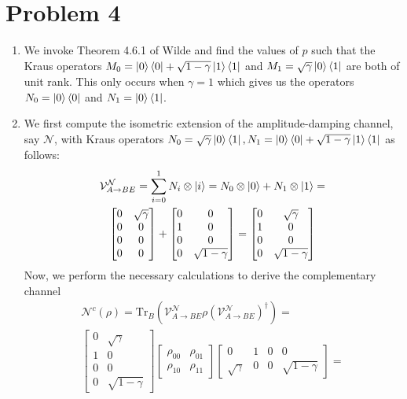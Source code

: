 \documentclass[12pt]{article}%
\begin{document}
\section*{Problem 4}
\begin{enumerate}
  \item We invoke Theorem 4.6.1 of Wilde and find the values of $p$ such that the Kraus operators $M_0 = \ket{0}\bra{0} + \sqrt{1 - \gamma}\ket{1}\bra{1}$ and $M_1 = \sqrt{\gamma}\ket{0}\bra{1}$ are both of unit rank. This only occurs when $\gamma = 1$ which gives us the operators $N_0 = \ket{0}\bra{0}$ and $N_1 = \ket{0}\bra{1}$.
  \item We first compute the isometric extension of the amplitude-damping channel, say $\mathcal{N}$, with Kraus operators $N_0 = \sqrt{\gamma}\ket{0}\bra{1},N_1 = \ket{0}\bra{0} + \sqrt{1 - \gamma}\ket{1}\bra{1}$ as follows:
  \begin{gather*}
    \mathcal{V}_{A \rightarrow BE}^{\mathcal{N}} = \sum_{i=0}^1 N_i \otimes \ket{i} = N_0 \otimes \ket{0} + N_1 \otimes \ket{1} = \\
    \left[\begin{matrix} 0 & \sqrt{\gamma} \\  0 & 0  \\ 0 & 0 \\ 0 & 0 \end{matrix}\right] + \left[\begin{matrix} 0 & 0 \\  1 & 0  \\ 0 & 0 \\ 0 & \sqrt{1-\gamma} \end{matrix}\right] = \left[\begin{matrix} 0 & \sqrt{\gamma} \\  1 & 0 \\ 0 &0 \\ 0 & \sqrt{1 - \gamma} \end{matrix}\right]
  \end{gather*}
  Now, we perform the necessary calculations to derive the complementary channel
  \begin{gather*}
    \mathcal{N}^c(\rho) = \text{Tr}_B(\mathcal{V}_{A \rightarrow BE}^{\mathcal{N}}\rho  (\mathcal{V}_{A \rightarrow BE}^{\mathcal{N}})^\dagger) = \\
    \left[\begin{matrix} 0 & \sqrt{\gamma} \\  1 & 0 \\ 0 &0 \\ 0 & \sqrt{1 - \gamma} \end{matrix}\right]\left[\begin{matrix} \rho_{00} & \rho_{01} \\ \rho_{10} & \rho_{11} \end{matrix}\right]\left[\begin{matrix} 0 & 1 & 0 & 0 \\ \sqrt{\gamma} & 0 & 0 & \sqrt{1 - \gamma}\end{matrix}\right] = \\

\end{gather*}
\end{enumerate}
\end{document}
